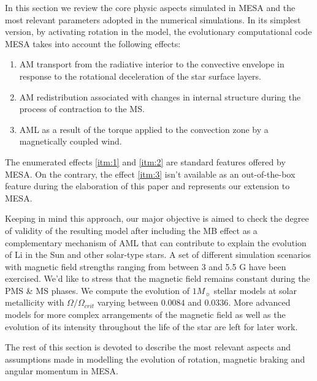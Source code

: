 \documentclass[fleqn,usenatbib]{mnras}
\begin{document}
In this section we review the core physic aspects simulated in MESA and the most relevant parameters adopted in the numerical simulations. In its simplest version, by activating rotation in the model, the evolutionary computational code MESA takes into account the following effects:
\begin{enumerate}
    \item AM transport from the radiative interior to the convective envelope in response to the rotational deceleration of the star surface layers\label{itm:1}.
    \item AM redistribution associated with changes in internal structure during the process of contraction to the MS\label{itm:2}.
    \item AML as a result of the torque applied to the convection zone by a magnetically coupled wind\label{itm:3}.
\end{enumerate}

The enumerated effects \ref{itm:1} and \ref{itm:2} are standard features offered by MESA. On the contrary, the effect \ref{itm:3} isn't available as an out-of-the-box feature during the elaboration of this paper and represents our extension to MESA.

Keeping in mind this approach, our major objective is aimed to check the degree of validity of the resulting model after including the MB effect as a complementary mechanism of AML that can contribute to explain the evolution of Li in the Sun and other solar-type stars. A set of different simulation scenarios with magnetic field strengths ranging from between 3 and 5.5 G have been exercised. We'd like to stress that the magnetic field remains constant during the PMS \& MS phases. We compute the evolution of $1M_{\sun}$ stellar models at solar metallicity with $\Omega / \Omega_{crit}$ varying between $0.0084$ and $0.0336$. More advanced models for more complex arrangements of the magnetic field as well as the evolution of its intensity throughout the life of the star are left for later work.\par

The rest of this section is devoted to describe the most relevant aspects and assumptions made in modelling the evolution of rotation, magnetic braking and angular momentum in MESA.\par
\end{document}
